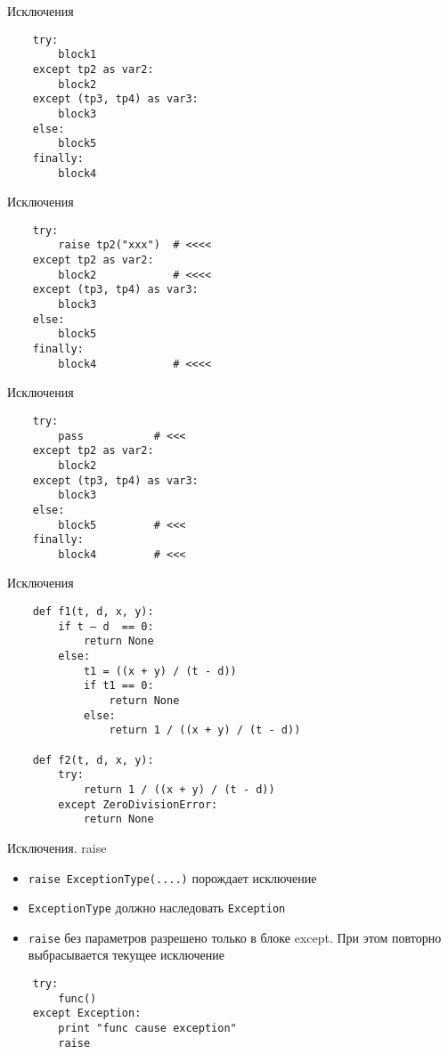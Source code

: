 \documentclass{article}
\begin{document}

\begin{center} Исключения \end{center}
\begin{lstlisting}
	try:
		block1
	except tp2 as var2:
		block2
	except (tp3, tp4) as var3:
		block3
	else:
		block5
	finally:
		block4
\end{lstlisting}
\newpage

\begin{center} Исключения \end{center}
\begin{lstlisting}
	try:
		raise tp2("xxx")  # <<<<
	except tp2 as var2:
		block2            # <<<<
	except (tp3, tp4) as var3:
		block3
	else:
		block5
	finally:
		block4            # <<<<
\end{lstlisting}
\newpage

\begin{center} Исключения \end{center}
\begin{lstlisting}
	try:
		pass           # <<<
	except tp2 as var2:
		block2
	except (tp3, tp4) as var3:
		block3
	else:
		block5         # <<<
	finally:
		block4         # <<<
\end{lstlisting}
\newpage

\begin{center} Исключения \end{center}
\begin{lstlisting}
	def f1(t, d, x, y):
		if t – d  == 0:
		    return None
		else:
		    t1 = ((x + y) / (t - d))
		    if t1 == 0:
		        return None
		    else:
		        return 1 / ((x + y) / (t - d))

	def f2(t, d, x, y):
		try:
		    return 1 / ((x + y) / (t - d))
		except ZeroDivisionError:
		    return None
\end{lstlisting}
\newpage

\begin{center} Исключения. raise \end{center}
\begin{itemize}
	\item \lstinline!raise ExceptionType(....)! порождает исключение
	\item \lstinline!ExceptionType! должно наследовать \lstinline!Exception!
	\item \lstinline!raise! без параметров разрешено только в блоке except. 
		При этом повторно выбрасывается текущее исключение
\end{itemize}
\begin{lstlisting}
	try:
		func()
	except Exception:
		print "func cause exception"
		raise
\end{lstlisting}
\newpage
\end{document}
